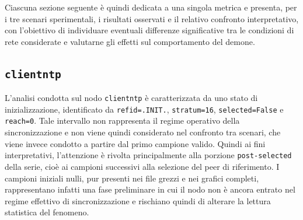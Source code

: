 Ciascuna sezione seguente è quindi dedicata a una singola metrica e presenta, per
i tre scenari sperimentali, i risultati osservati e il relativo confronto
interpretativo, con l’obiettivo di individuare eventuali differenze significative
tra le condizioni di rete considerate e valutarne gli effetti sul comportamento del
demone.

\subsection{\texttt{clientntp}}
L'analisi condotta sul nodo \texttt{clientntp} è caratterizzata da uno stato di
inizializzazione, identificato da \texttt{refid=.INIT.}, \texttt{stratum=16}, \texttt{selected=False}
e \texttt{reach=0}. Tale intervallo non rappresenta il regime operativo della
sincronizzazione e non viene quindi considerato nel confronto tra scenari, che viene
invece condotto a partire dal primo campione valido. Quindi ai fini
interpretativi, l’attenzione è rivolta principalmente alla porzione \texttt{post-selected}
della serie, cioè ai campioni successivi alla selezione del peer di riferimento.
I campioni iniziali nulli, pur presenti nei file grezzi e nei grafici completi,
rappresentano infatti una fase preliminare in cui il nodo non è ancora entrato
nel regime effettivo di sincronizzazione e rischiano quindi di alterare la
lettura statistica del fenomeno.
